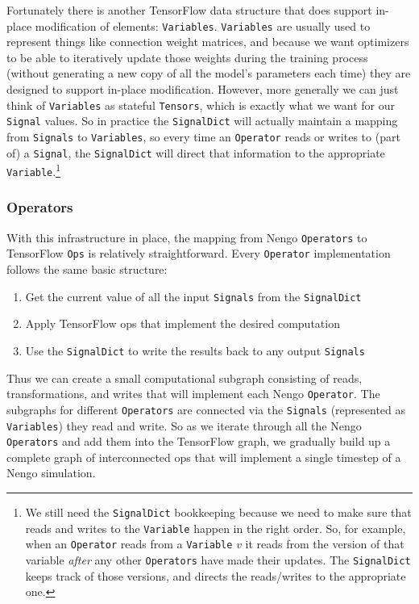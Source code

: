 \documentclass{article}
\begin{document}
Fortunately there is another TensorFlow data structure that does support in-place modification of elements: \texttt{Variables}.  \texttt{Variables} are usually used to represent things like connection weight matrices, and because we want optimizers to be able to iteratively update those weights during the training process (without generating a new copy of all the model's parameters each time) they are designed to support in-place modification.  However, more generally we can just think of \texttt{Variables} as stateful \texttt{Tensors}, which is exactly what we want for our \texttt{Signal} values.  So in practice the \texttt{SignalDict} will actually maintain a mapping from \texttt{Signals} to \texttt{Variables}, so every time an \texttt{Operator} reads or writes to (part of) a \texttt{Signal}, the \texttt{SignalDict} will direct that information to the appropriate \texttt{Variable}.\footnote{We still need the \texttt{SignalDict} bookkeeping because we need to make sure that reads and writes to the \texttt{Variable} happen in the right order.  So, for example, when an \texttt{Operator} reads from a \texttt{Variable} $v$ it reads from the version of that variable \emph{after} any other \texttt{Operators} have made their updates.  The \texttt{SignalDict} keeps track of those versions, and directs the reads/writes to the appropriate one.}

\subsubsection{Operators}

With this infrastructure in place, the mapping from Nengo \texttt{Operators} to TensorFlow \texttt{Ops} is relatively straightforward.  Every \texttt{Operator} implementation follows the same basic structure:

\begin{enumerate}
\item Get the current value of all the input \texttt{Signals} from the \texttt{SignalDict}
\item Apply TensorFlow ops that implement the desired computation
\item Use the \texttt{SignalDict} to write the results back to any output \texttt{Signals}
\end{enumerate}

Thus we can create a small computational subgraph consisting of reads, transformations, and writes that will implement each Nengo \texttt{Operator}.  The subgraphs for different \texttt{Operators} are connected via the \texttt{Signals} (represented as \texttt{Variables}) they read and write.  So as we iterate through all the Nengo \texttt{Operators} and add them into the TensorFlow graph, we gradually build up a complete graph of interconnected ops that will implement a single timestep of a Nengo simulation.
\end{document}

